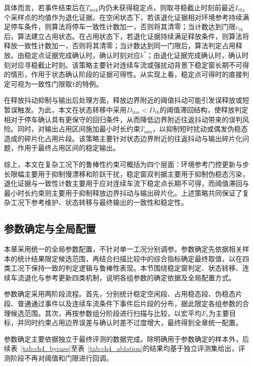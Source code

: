 \documentclass{xdupgthesis}
\begin{document}
具体而言，若事件结束后在$T_{\mathrm{seek}}$内仍未获得稳定点，则取寻稳截止时刻前最近$L_{\mathrm{fix}}$个采样点的均值作为退化证据。在空闲状态下，若该退化证据相对环境参考持续满足停车条件，则算法将停车一致性计数加一，否则将其清零；当计数达到门限$c_{\mathrm{th}}$后，算法建立占用状态。在占用状态下，若退化证据持续满足释放条件，则算法将释放一致性计数加一，否则将其清零；当计数达到同一门限后，算法判定占用释放。由稳定点证据完成确认时，确认时刻对应$k^\ast$；由退化证据完成确认时，确认时刻对应寻稳截止时刻。该策略主要针对连续车流或强扰动背景下稳定窗长期不可得的情形，作用于状态确认阶段的证据可得性。从实现上看，稳定点可得时的直接判定可视为一致性门限取1的特例。

在释放抖动抑制与输出后处理方面，释放边界附近的阈值抖动可能引发误释放或短暂误触发。为此，本文在状态转移中采用$D_{\mathrm{free}}<D_{\mathrm{th}}$的阈值滞回结构，使释放判定相对于停车确认具有更保守的回归条件，从而降低边界附近往返抖动带来的误判风险。同时，对输出占用区间施加最小时长约束$T_{\min}$，以抑制短时扰动或偶发伪稳态造成的碎片化占用片段。该策略主要针对状态边界附近的往返抖动与输出碎片化问题，作用于最终占用区间的稳定输出。

综上，本文在复杂工况下的鲁棒性约束可概括为四个层面：环境参考门控更新与步长限幅主要用于抑制慢漂移和阶跃干扰，稳定窗双判据主要用于抑制伪稳态污染，退化证据与一致性计数主要用于应对连续车流下稳定点长期不可得，而阈值滞回与最小时长约束则主要用于抑制释放边界抖动与输出碎片化。上述策略共同保证了复杂工况下参考维护、状态转移与最终输出的一致性和稳定性。

\subsection{参数确定与全局配置}
\label{subsec:ch4_paramset}

本章采用统一的全局参数配置，不针对单一工况分别调参。参数确定先依据相关样本的统计结果限定候选范围，再结合扫描比较中的综合指标确定最终取值，以在四类工况下保持一致的判定逻辑与鲁棒性表现。本节围绕稳定窗判定、状态转移、连续车流退化与参考更新四类机制，说明各组参数的确定依据及全局配置方式。

参数确定采用两阶段流程。首先，分别统计稳定空闲段、占用稳态段、伪稳态片段、普通通过事件以及连续车流条件下事件后片段的分布，据此限定各组参数的合理候选范围。其次，再按参数组分阶段进行扫描与比较，以宏平均$F_1$为主要目标，并同时约束占用边界误差与确认时差不过度增大，最终得到全章统一配置。

参数确定主要依据独立于最终评测的数据完成。除明确用于参数确定的样本外，后续表~\ref{tab:ch4_bycase}至表~\ref{tab:ch4_ablation}的结果均基于独立评测集给出，评测阶段不再对阈值和门限进行回调。
\end{document}
